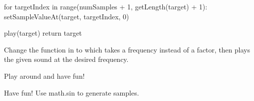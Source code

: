 \begin{exercises}
\begin{ex}
\begin{example}
  for targetIndex in range(numSamples + 1, getLength(target) + 1):
    setSampleValueAt(target, targetIndex, 0)

  play(target)
  return target
\end{example}
\end{ex}

\begin{ex}
Change the  function in  to
 which takes a frequency instead of a factor, then
plays the given sound at the desired frequency.
\end{ex}

\begin{ex}
Play around and have fun!
\end{ex}

\begin{ex}
Have fun! Use math.sin to generate samples.
\end{ex}
\end{exercises}

